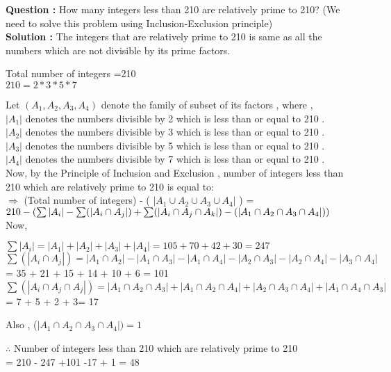 \documentclass[]{article}
\begin{document}
{\bf Question : }How many integers less than 210 are relatively prime to 210? (We need to solve this problem using Inclusion-Exclusion principle) \\
{\bf Solution : }  The integers that are relatively prime to 210 is same as all the numbers which are not divisible by its prime factors. 
\begin{center}
Total number of integers  =210\\
$210 = 2*3*5*7$
\end{center}
Let $(A_1,A_2,A_3,A_4)$ denote the family of subset of its  factors , where , \\
$|A_1|$ denotes the numbers divisible by 2 which is less than or equal to 210 .  \\
$|A_2|$ denotes the numbers divisible by 3 which is less than or equal to 210 .  \\
$|A_3|$ denotes the numbers divisible by 5 which is less than or equal to 210 .  \\
$|A_4|$ denotes the numbers divisible by 7 which is less than or equal to 210 .  \\
Now,  by the Principle of Inclusion and Exclusion , number of integers less than 210 which are relatively prime to 210 is equal to: \\
$\Rightarrow$
(Total number of integers) - ( $|A_1 \cup A_2 \cup A_3 \cup A_4|$ ) =\\
 $   210 - ( \sum |A_i| -\sum (|A_i \cap A_j|) + \sum(|A_i \cap A_j \cap A_k|) - (|A_1 \cap A_2 \cap A_3 \cap A_4| ))\vspace{3 mm}$\\
Now,
\begin{center}
$\sum |A_i| = |A_1| + |A_2| + |A_3| + |A_4| = 105 + 70 + 42 + 30 = 247 $\\
$\sum (|A_i \cap A_j|)=   |A_1 \cap A_2| - |A_1 \cap A_3| - |A_1 \cap A_4|  - |A_2 \cap A_3| - |A_2 \cap A_4| - |A_3 \cap A_4| $
= 35 + 21 + 15 + 14 + 10 + 6 =  101 \\
$\sum (|A_i \cap A_j \cap A_j|)= |A_1 \cap A_2 \cap A_3| + |A_1 \cap A_2 \cap A_4| + |A_2 \cap A_3 \cap A_4| + |A_1 \cap A_4 \cap A_3|   $
= 7 + 5 + 2 + 3= 17 \\
\end{center}
Also , ($ |A_1 \cap A_2 \cap A_3 \cap A_4|) = 1 $ 
\begin{center}
$\therefore$ Number of integers less than 210 which are relatively prime to 210\\ = 210 - 247 +101 -17 + 1 = 48
\end{center}
\end{document}
